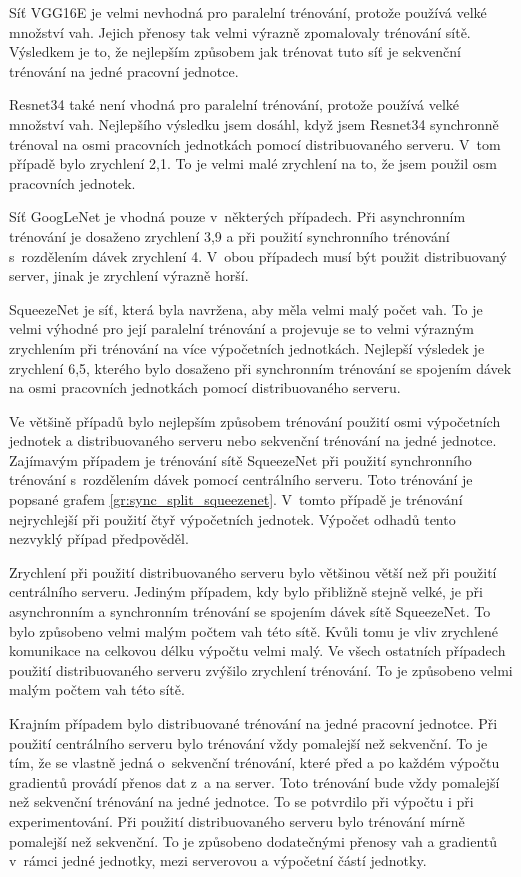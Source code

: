 Síť VGG16E je velmi nevhodná pro paralelní trénování, protože používá velké množství vah.
Jejich přenosy tak velmi výrazně zpomalovaly trénování sítě.
Výsledkem je to, že nejlepším způsobem jak trénovat tuto síť je sekvenční trénování na jedné pracovní jednotce.

Resnet34 také není vhodná pro paralelní trénování, protože používá velké množství vah.
Nejlepšího výsledku jsem dosáhl, když jsem Resnet34 synchronně trénoval na osmi pracovních jednotkách pomocí distribuovaného serveru.
V~tom případě bylo zrychlení 2,1.
To je velmi malé zrychlení na to, že jsem použil osm pracovních jednotek.

Síť GoogLeNet je vhodná pouze v~některých případech.
Při asynchronním trénování je dosaženo zrychlení 3,9 a při použití synchronního trénování s~rozdělením dávek zrychlení 4.
V~obou případech musí být použit distribuovaný server, jinak je zrychlení výrazně horší.

SqueezeNet je síť, která byla navržena, aby měla velmi malý počet vah.
To je velmi výhodné pro její paralelní trénování a projevuje se to velmi výrazným zrychlením při trénování na více výpočetních jednotkách.
Nejlepší výsledek je zrychlení 6,5, kterého bylo dosaženo při synchronním trénování se spojením dávek na osmi pracovních jednotkách pomocí distribuovaného serveru.

Ve většině případů bylo nejlepším způsobem trénování použití osmi výpočetních jednotek a distribuovaného serveru nebo sekvenční trénování na jedné jednotce.
Zajímavým případem je trénování sítě SqueezeNet při použití synchronního trénování s~rozdělením dávek pomocí centrálního serveru.
Toto trénování je popsané grafem \ref{gr:sync_split_squeezenet}.
V~tomto případě je trénování nejrychlejší při použití čtyř výpočetních jednotek.
Výpočet odhadů tento nezvyklý případ předpověděl.

Zrychlení při použití distribuovaného serveru bylo většinou větší než při použití centrálního serveru.
Jediným případem, kdy bylo přibližně stejně velké, je při asynchronním a synchronním trénování se spojením dávek sítě SqueezeNet.
To bylo způsobeno velmi malým počtem vah této sítě.
Kvůli tomu je vliv zrychlené komunikace na celkovou délku výpočtu velmi malý.
Ve všech ostatních případech použití distribuovaného serveru zvýšilo zrychlení trénování.
To je způsobeno velmi malým počtem vah této sítě.

Krajním případem bylo distribuované trénování na jedné pracovní jednotce.
Při použití centrálního serveru bylo trénování vždy pomalejší než sekvenční.
To je tím, že se vlastně jedná o~sekvenční trénování, které před a po každém výpočtu gradientů provádí přenos dat z~a na server.
Toto trénování bude vždy pomalejší než sekvenční trénování na jedné jednotce.
To se potvrdilo při výpočtu i při experimentování.
Při použití distribuovaného serveru bylo trénování mírně pomalejší než sekvenční.
To je způsobeno dodatečnými přenosy vah a gradientů v~rámci jedné jednotky, mezi serverovou a výpočetní částí jednotky.

